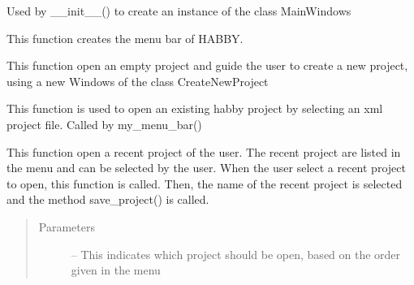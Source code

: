 \documentclass[letterpaper,10pt,english]{sphinxmanual}
\begin{document}
\begin{fulllineitems}

\begin{fulllineitems}
\label{\detokenize{index:src_GUI.Main_windows_1.MainWindows.init_ui}}
Used by \_\_init\_\_() to create an instance of the class MainWindows

\end{fulllineitems}


\begin{fulllineitems}
\label{\detokenize{index:src_GUI.Main_windows_1.MainWindows.my_menu_bar}}
This function creates the menu bar of HABBY.

\end{fulllineitems}


\begin{fulllineitems}
\label{\detokenize{index:src_GUI.Main_windows_1.MainWindows.new_project}}
This function open an empty project and guide the user to create a new project, using a new Windows
of the class CreateNewProject

\end{fulllineitems}


\begin{fulllineitems}
\label{\detokenize{index:src_GUI.Main_windows_1.MainWindows.open_project}}
This function is used to open an existing habby project by selecting an xml project file. Called by
my\_menu\_bar()

\end{fulllineitems}


\begin{fulllineitems}
\label{\detokenize{index:src_GUI.Main_windows_1.MainWindows.open_recent_project}}
This function open a recent project of the user. The recent project are listed in the menu and can be
selected by the user. When the user select a recent project to open, this function is called. Then, the name of
the recent project is selected and the method save\_project() is called.
\begin{quote}\begin{description}
\item[{Parameters}] \leavevmode
{} -- This indicates which project should be open, based on the order given in the menu


\end{description}
\end{quote}
\end{fulllineitems}
\end{fulllineitems}
\end{document}
